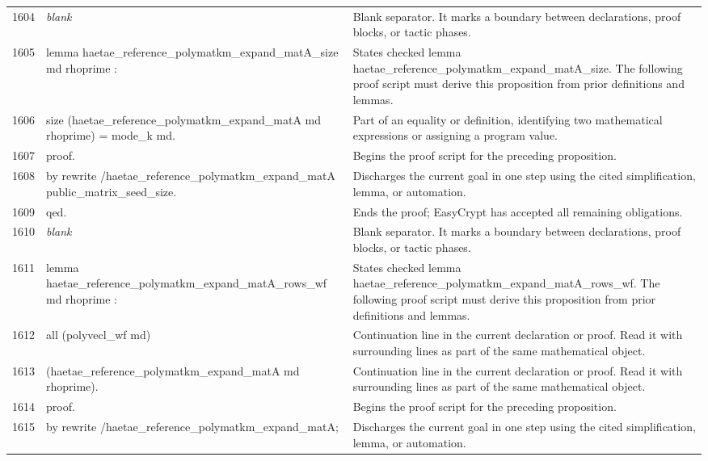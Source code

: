 \documentclass[10pt]{article}
\begin{document}
\begin{longtable}{r L{0.53\textwidth} L{0.37\textwidth}}
1604 & {\ttfamily\scriptsize \emph{blank}} & Blank separator.  It marks a boundary between declarations, proof blocks, or tactic phases. \\
1605 & {\ttfamily\scriptsize lemma haetae\_reference\_polymatkm\_expand\_matA\_size md rhoprime :} & States checked lemma haetae\_reference\_polymatkm\_expand\_matA\_size.  The following proof script must derive this proposition from prior definitions and lemmas. \\
1606 & {\ttfamily\scriptsize   size (haetae\_reference\_polymatkm\_expand\_matA md rhoprime) = mode\_k md.} & Part of an equality or definition, identifying two mathematical expressions or assigning a program value. \\
1607 & {\ttfamily\scriptsize proof.} & Begins the proof script for the preceding proposition. \\
1608 & {\ttfamily\scriptsize by rewrite /haetae\_reference\_polymatkm\_expand\_matA public\_matrix\_seed\_size.} & Discharges the current goal in one step using the cited simplification, lemma, or automation. \\
1609 & {\ttfamily\scriptsize qed.} & Ends the proof; EasyCrypt has accepted all remaining obligations. \\
1610 & {\ttfamily\scriptsize \emph{blank}} & Blank separator.  It marks a boundary between declarations, proof blocks, or tactic phases. \\
1611 & {\ttfamily\scriptsize lemma haetae\_reference\_polymatkm\_expand\_matA\_rows\_wf md rhoprime :} & States checked lemma haetae\_reference\_polymatkm\_expand\_matA\_rows\_wf.  The following proof script must derive this proposition from prior definitions and lemmas. \\
1612 & {\ttfamily\scriptsize   all (polyvecl\_wf md)} & Continuation line in the current declaration or proof.  Read it with surrounding lines as part of the same mathematical object. \\
1613 & {\ttfamily\scriptsize     (haetae\_reference\_polymatkm\_expand\_matA md rhoprime).} & Continuation line in the current declaration or proof.  Read it with surrounding lines as part of the same mathematical object. \\
1614 & {\ttfamily\scriptsize proof.} & Begins the proof script for the preceding proposition. \\
1615 & {\ttfamily\scriptsize by rewrite /haetae\_reference\_polymatkm\_expand\_matA;} & Discharges the current goal in one step using the cited simplification, lemma, or automation. \\

\end{longtable}
\end{document}
